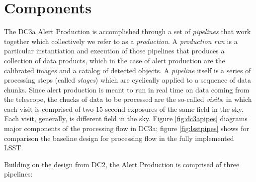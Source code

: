 
\section{Components}  \label{sec:components}

The DC3a Alert Production is accomplished through a set of
\textit{pipelines} that work together which collectively we refer to
as a \textit{production}.  A \textit{production run} is a particular
instantiation and execution of those pipelines that produces a
collection of data products, which in the case of alert production are
the calibrated images and a catalog of detected objects.  A
\textit{pipeline} itself is a series of processing steps (called
\textit{stages}) which are cyclically applied to a sequence of data
chunks.  Since alert production is meant to run in real time on data
coming from the telescope, the chucks of data to be processed are the
so-called \textit{visits}, in which each visit is comprised of two
15-second exposures of the same field in the sky.  Each visit,
generally, is different field in the sky.    
Figure \ref{fig:dc3apipes} diagrams major components of the processing flow in DC3a;
figure \ref{fig:lsstpipes} shows for comparison the baseline design for processing 
flow in the fully implemented LSST.

Building on the design from DC2, the Alert Production is comprised of
three pipelines: 

